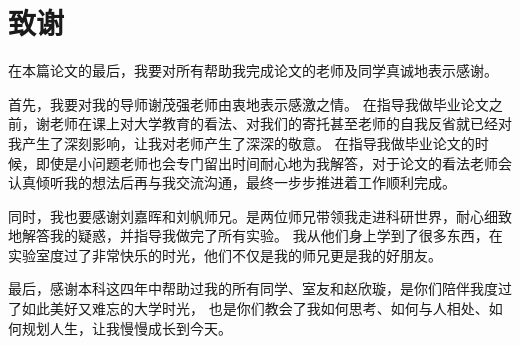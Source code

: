 
\chapter*{致谢}
在本篇论文的最后，我要对所有帮助我完成论文的老师及同学真诚地表示感谢。


首先，我要对我的导师谢茂强老师由衷地表示感激之情。
在指导我做毕业论文之前，谢老师在课上对大学教育的看法、对我们的寄托甚至老师的自我反省就已经对我产生了深刻影响，让我对老师产生了深深的敬意。
在指导我做毕业论文的时候，即使是小问题老师也会专门留出时间耐心地为我解答，对于论文的看法老师会认真倾听我的想法后再与我交流沟通，最终一步步推进着工作顺利完成。


同时，我也要感谢刘嘉晖和刘帆师兄。是两位师兄带领我走进科研世界，耐心细致地解答我的疑惑，并指导我做完了所有实验。
我从他们身上学到了很多东西，在实验室度过了非常快乐的时光，他们不仅是我的师兄更是我的好朋友。


最后，感谢本科这四年中帮助过我的所有同学、室友和赵欣璇，是你们陪伴我度过了如此美好又难忘的大学时光，
也是你们教会了我如何思考、如何与人相处、如何规划人生，让我慢慢成长到今天。
